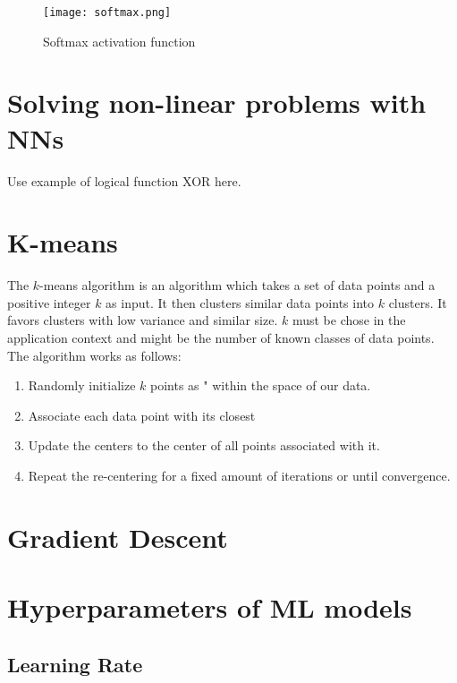 \begin{figure}[h]
    \centering
    \texttt{[image: softmax.png]}
    \caption{Softmax activation function}
    \label{fig:softmax}
\end{figure}

\section{Solving non-linear problems with NNs}

\label{sec:solving_non_linear_problems_with_nns}

Use example of logical function XOR here.

\section{K-means}

The $k$-means algorithm is an algorithm which takes a set of data points and a positive integer $k$ as input. It then clusters similar data points into $k$ clusters. It favors clusters with low variance and similar size. $k$ must be chose in the application context and might be the number of known classes of data points.\\
The algorithm works as follows:
\begin{enumerate}
    \item Randomly initialize $k$ points as " within the space of our data.
    \item Associate each data point with its closest 
    \item Update the centers to the center of all points associated with it.
    \item Repeat the re-centering for a fixed amount of iterations or until convergence.
\end{enumerate}

\section{Gradient Descent}

\section{Hyperparameters of ML models}

\subsection{Learning Rate}
